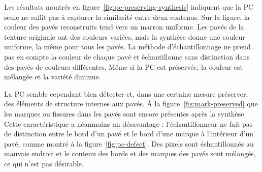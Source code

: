 \bigskip

Les résultats montrés en figure~\ref{fig:pc-preserving-synthesis} indiquent que la PC seule ne suffit pas à capturer la similarité entre deux contenus. Sur la figure, la couleur des pavés reconstruits tend vers un marron uniforme. Les pavés de la texture originale ont des couleurs variées, mais la synthèse donne une couleur uniforme, la même pour tous les pavés. La méthode d'échantillonnage ne prend pas en compte la couleur de chaque pavé et échantillonne sans distinction dans des pavés de couleurs différentes. Même si la PC est préservée, la couleur est mélangée et la variété diminue.

\bigskip

La PC semble cependant bien détecter et, dans une certaine mesure préserver, des éléments de structure internes aux pavés. À la figure~\ref{fig:mark-preserved} que les marques ou fissures dans les pavés sont encore présentes après la synthèse. Cette caractéristique a néanmoins un désavantage : l'échantillonneur ne fait pas de distinction entre le bord d'un pavé et le bord d'une marque à l'intérieur d'un pavé, comme montré à la figure~\ref{fig:pc-defect}. Des pixels sont échantillonnés au mauvais endroit et le contenu des bords et des marques des pavés sont mélangés, ce qui n'est pas désirable.

\bigskip

